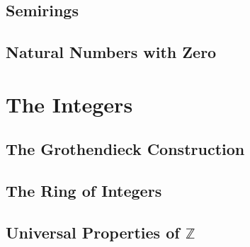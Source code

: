 \subsection{Semirings}




\subsection{Natural Numbers with Zero}





\section{The Integers}

\subsection{The Grothendieck Construction}







\subsection{The Ring of Integers}






\subsection{Universal Properties of \texorpdfstring{$\mathbb Z$}{Z}}


